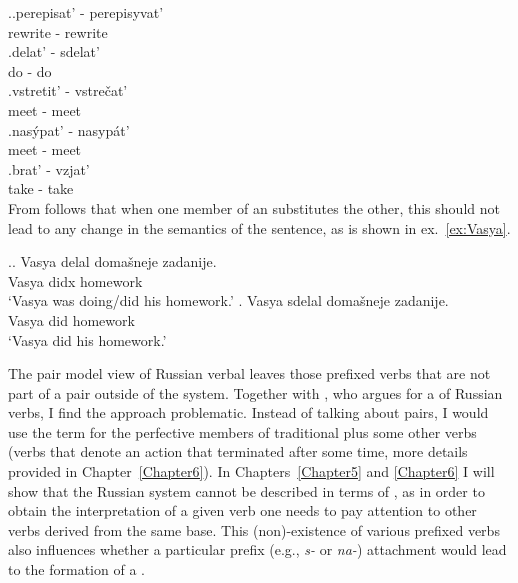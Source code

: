 \ex.\ag.\label{pair1}perepisat'\textsuperscript{\PF} - perepisyvat'\textsuperscript{\IPF}\\
rewrite - rewrite\\
\bg.\label{pair2}delat'\textsuperscript{\IPF} - sdelat'\textsuperscript{\PF}\\
do - do\\
\bg.\label{pair3}vstretit'\textsuperscript{\PF} - vstre\v{c}at'\textsuperscript{\IPF}\\
meet - meet\\
\bg.\label{pair4}nas\'ypat'\textsuperscript{\PF} - nasyp\'at'\textsuperscript{\IPF}\\
meet - meet\\
\bg.\label{pair5}brat'\textsuperscript{\IPF} - vzjat'\textsuperscript{\PF}\\
take - take\\

From  follows that when one member of an  substitutes the other, this should not lead to any change in the semantics of the sentence, as is shown in ex.~\ref{ex:Vasya}.

\ex.\label{ex:Vasya}\ag. Vasya delal\textsuperscript{\IPF} {doma\v{s}neje zadanije}.\\
Vasya didx homework\\
\trans `Vasya was doing/did his homework.'
\bg. Vasya sdelal\textsuperscript{\PF} {doma\v{s}neje zadanije}.\\
Vasya did homework\\
\trans `Vasya did his homework.'

The pair model view of Russian verbal  leaves those prefixed verbs that are not part of a pair outside of the system. Together with \citet{Janda:07a}, who argues for a  of Russian verbs, I find the  approach problematic. Instead of talking about pairs, I would use the term \textit{} for the perfective members of traditional  plus some other verbs (verbs that denote an action that terminated after some time, more details provided in Chapter~\ref{Chapter6}). In Chapters~\ref{Chapter5} and \ref{Chapter6} I will show that the Russian  system cannot be described in terms of , as in order to obtain the interpretation of a given verb one needs to pay attention to other verbs derived from the same base. This (non)-existence of various prefixed verbs also influences whether a particular prefix (e.g., \textit{s-} or \textit{na-}) attachment would lead to the formation of a .

